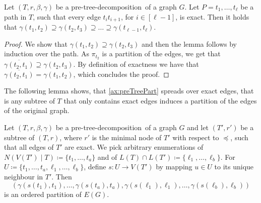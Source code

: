 \documentclass{lmcs}
\theoremstyle{plain}\newtheorem{claim}[thm]{Claim}   %
\newcommand{\complementOf}[1]{\ensuremath{\overline{#1}}}
\newcommand{\fktmid}{\ensuremath{\mid}}
\newcommand{\preTreeDec}{pre-tree-decomposition}
\begin{document}
\begin{lem}
	\label{obs:exact-path}
	Let $(T,r,\beta,\gamma)$ be a \preTreeDec\ of a graph $G$.
	Let $P=t_1,\ldots,t_\ell$ be a path in $T$, such that every edge $t_it_{i+1}$, for $i\in[\ell-1]$, is exact.
	Then it holds that
	$\gamma(t_1,t_2) \supseteq \gamma(t_2,t_3) \supseteq \ldots \supseteq \gamma(t_{\ell-1},t_\ell)$.
\end{lem}

\begin{proof}
	We show that $\gamma(t_1,t_2) \supseteq \gamma(t_2,t_3)$ and then the lemma follows by induction over the path.
	As $\pi_{t_2}$ is a partition of the edges, we get that $\complementOf{\gamma(t_2,t_1)} \supseteq \gamma(t_2,t_3)$.
	By definition of exactness we have that $\complementOf{\gamma(t_2,t_1)}=\gamma(t_1,t_2)$, which concludes the proof.
\end{proof}

The following lemma shows, that \ref{ax:preTreePart} spreads over exact edges, that is any subtree of $T$ that only contains exact edges induces a partition of the edges of the original graph.

\begin{lem}
	\label{obs:exact-subtree}
	Let $(T,r,\beta,\gamma)$ be a \preTreeDec\ of a graph $G$ and let $(T',r')$ be a subtree of $(T,r)$, where $r'$ is the minimal node of $T'$ with respect to $\preceq$, such that all edges of $T'$ are exact.
	We pick arbitrary enumerations of $N(V(T')\fktmid T)\coloneqq \{t_1,\ldots,t_a\}$ and of $L(T)\cap L(T')\coloneqq \{\ell_1,\ldots,\ell_b\}$.
	For $U\coloneqq\{t_1,\ldots,t_a,\ell_1,\ldots,\ell_b\}$, 
	define $s\colon U\rightarrow V(T')$ by mapping $u \in U$ to its unique neighbour in $T'$.
	Then \[ (\gamma(s(t_1),t_1),\ldots, \gamma(s(t_a),t_a),\gamma(s(\ell_1),\ell_1), \ldots,\gamma(s(\ell_b),\ell_b)) \] is an ordered partition of $E(G)$.
\end{lem}
\end{document}
